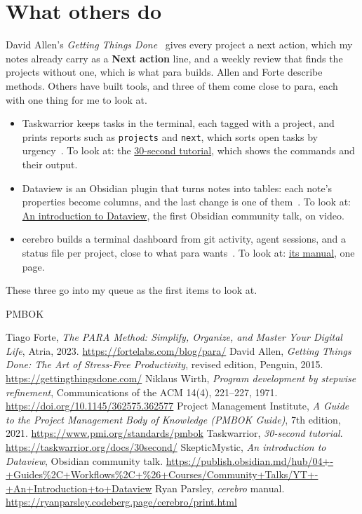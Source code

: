 \documentclass[11pt,a4paper]{article}
\newcommand{\n}[1]{\textsf{#1}}
\begin{document}
\section{What others do}

David Allen's \textit{Getting Things Done}~\cite{gtd} gives every project a next action, which my notes already carry as a \textbf{Next action} line, and a weekly review that finds the projects without one, which is what \n{para} builds. Allen and Forte describe methods. Others have built tools, and three of them come close to \n{para}, each with one thing for me to look at.
\begin{itemize}
  \item \n{Taskwarrior} keeps tasks in the terminal, each tagged with a project, and prints reports such as \texttt{projects} and \texttt{next}, which sorts open tasks by urgency~\cite{tw}. To look at: the \href{https://taskwarrior.org/docs/30second/}{30-second tutorial}, which shows the commands and their output.
  \item \n{Dataview} is an \n{Obsidian} plugin that turns notes into tables: each note's properties become columns, and the last change is one of them~\cite{dv}. To look at: \href{https://publish.obsidian.md/hub/04+-+Guides\%2C+Workflows\%2C+\%26+Courses/Community+Talks/YT+-+An+Introduction+to+Dataview}{An introduction to Dataview}, the first Obsidian community talk, on video.
  \item \n{cerebro} builds a terminal dashboard from git activity, agent sessions, and a status file per project, close to what \n{para} wants~\cite{cb}. To look at: \href{https://ryanparsley.codeberg.page/cerebro/print.html}{its manual}, one page.
\end{itemize}
These three go into my queue as the first items to look at.

\begin{thebibliography}{PMBOK}\raggedright
{} Tiago Forte, \textit{The PARA Method: Simplify, Organize, and Master Your Digital Life}, Atria, 2023. \url{https://fortelabs.com/blog/para/}
 David Allen, \textit{Getting Things Done: The Art of Stress-Free Productivity}, revised edition, Penguin, 2015. \url{https://gettingthingsdone.com/}
 Niklaus Wirth, \textit{Program development by stepwise refinement}, Communications of the ACM 14(4), 221--227, 1971. \url{https://doi.org/10.1145/362575.362577}
 Project Management Institute, \textit{A Guide to the Project Management Body of Knowledge (PMBOK Guide)}, 7th edition, 2021. \url{https://www.pmi.org/standards/pmbok}
 Taskwarrior, \textit{30-second tutorial}. \url{https://taskwarrior.org/docs/30second/}
 SkepticMystic, \textit{An introduction to Dataview}, Obsidian community talk. \url{https://publish.obsidian.md/hub/04+-+Guides\%2C+Workflows\%2C+\%26+Courses/Community+Talks/YT+-+An+Introduction+to+Dataview}
 Ryan Parsley, \textit{cerebro} manual. \url{https://ryanparsley.codeberg.page/cerebro/print.html}
\end{thebibliography}

\revisiontable
\end{document}
